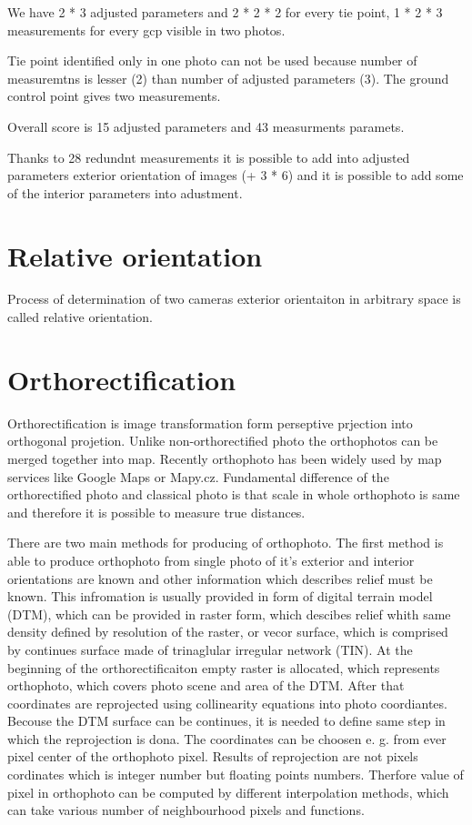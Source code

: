 \documentclass[a4paper,12pt]{report}
\begin{document}
\begin{itemize}
We have 2 * 3 adjusted parameters and 2 * 2 * 2 for every tie point,  
1 * 2 * 3 measurements for every gcp visible in two photos.

Tie point identified only in one photo can not be used because number of measuremtns is lesser (2) than number of adjusted parameters (3).
The ground control point gives two measurements.


Overall score is 15 adjusted parameters and 43 measurments paramets.

Thanks to 28 redundnt measurements it is possible to add into adjusted parameters exterior orientation of images (+ 3 * 6) and it is possible to
add some of the interior parameters into adustment.  

\section{Relative orientation}

Process of determination of two cameras exterior orientaiton in arbitrary space is called relative orientation.


\section{Orthorectification}

Orthorectification is image transformation form perseptive prjection into orthogonal projetion.
Unlike non-orthorectified photo the orthophotos can be merged together into map. Recently 
orthophoto has been widely used by map services like Google Maps or Mapy.cz. Fundamental 
difference of the orthorectified photo and classical photo is that scale in whole orthophoto is same
and therefore it is possible to measure true distances. 


\label{sec:single_ortho}
There are two main methods for producing of orthophoto. The first method is able to produce orthophoto 
from single photo of it's exterior and interior orientations are known and other information which describes
relief must be known. This infromation is usually provided in form of digital terrain model (DTM), which 
can be provided in raster form, which descibes relief whith same density defined by resolution of the raster, 
or vecor surface, which is comprised by continues surface made of trinaglular irregular network (TIN).  
At the beginning of the orthorectificaiton empty raster is allocated, which represents orthophoto, 
which covers photo scene and area of the DTM. After that coordinates are reprojected using collinearity
equations into photo coordiantes. Becouse the DTM surface can be continues, it is needed to define 
same step in which the reprojection is dona. The coordinates can be choosen e. g. from ever pixel center
of the orthophoto pixel. Results of reprojection are not pixels cordinates which is integer number but 
floating points numbers. Therfore value of pixel in orthophoto can be computed by different interpolation methods,
which can take various number of neighbourhood pixels and functions.


\end{itemize}
\end{document}
